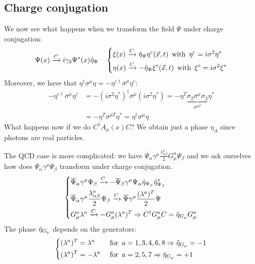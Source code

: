 \documentclass[../main.tex]{subfiles}
\begin{document}
\subsection{Charge conjugation}
We now see what happens when we transform the field $\Psi$ under charge conjugation:
\[
\Psi(x)\xrightarrow[]{C}i\gamma_2\Psi^*(x)\Tilde{\eta}_\Psi
\quad
\left\{
\begin{aligned}
&\xi(x)\xrightarrow[]{C}\Tilde{\eta}_\Psi\eta^c(\Vec{x},t) \,\text{ with }\, \eta^c=i\sigma^2\eta^*\\
&\eta(x)\xrightarrow[]{C}-\Tilde{\eta}_\Psi\xi^c(\Vec{x},t) \,\text{ with }\, \xi^c=i\sigma^2\xi^*
\end{aligned}
\right.
\]
Moreover, we have that $\eta^\dagger\sigma^\mu\eta=-\eta^{c\dagger}\overline{\sigma}^\mu\eta^c$:
\begin{align*}
-\eta^{c\dagger}\overline{\sigma}^\mu\eta^c&=-(i\sigma^2\eta^*)^\dagger\overline{\sigma}^\mu(i\sigma^2\eta^*)=-\eta^T\underbrace{\sigma_2\overline{\sigma}^\mu\sigma_2}_{\sigma^{\mu T}}\eta^*\\
&=-\eta^T\sigma^{\mu T}\eta^*=\eta^\dagger\sigma^\mu\eta
\end{align*}
What happens now if we do $C^\dagger A_\mu(x)C$? We obtain just a phase $\eta_A$ since photons are real particles.

The QCD case is more complicated: we have $\overline{\Psi}_\alpha\gamma^\mu\frac{\lambda^a_{\alpha\beta}}{2}G_\mu^a\Psi_\beta$ and we ask ourselves how does $\overline{\Psi}_\alpha\gamma^\mu\Psi_\beta$ transform under charge conjugation.
\[
\left\{
\begin{aligned}
&\overline{\Psi}_\alpha\gamma^\mu\Psi_\beta\xrightarrow[]{C}-\overline{\Psi}_\beta\gamma^\mu\Psi_\alpha\Tilde{\eta}_{\Psi_\alpha}\Tilde{\eta}^*_{\Psi_\beta}\\
&\overline{\Psi}_\alpha\gamma^\mu\frac{\lambda^a_{\alpha\beta}}{2}\Psi_\beta\xrightarrow[]{C}\overline{\Psi}\gamma^\mu\frac{(\lambda^a)^T}{2}\Psi\\
&G_\mu^a\lambda^a\xrightarrow[]{C}-G_\mu^a(\lambda^a)^T\Rightarrow C^\dagger G_\mu^a C=\Tilde{\eta}_{G_\mu}G_\mu^a
\end{aligned}
\right.
\]
The phase $\Tilde{\eta}_{G_\mu}$ depends on the generators:
\[
\left\{
\begin{aligned}
&(\lambda^a)^T=\lambda^a &&\text{ for } \, a=1,3,4,6,8\Rightarrow\Tilde{\eta}_{G_\mu}=-1\\
&(\lambda^a)^T=-\lambda^a &&\text{ for } \, a=2,5,7\Rightarrow\Tilde{\eta}_{G_\mu}=+1
\end{aligned}
\right.
\]
\end{document}
